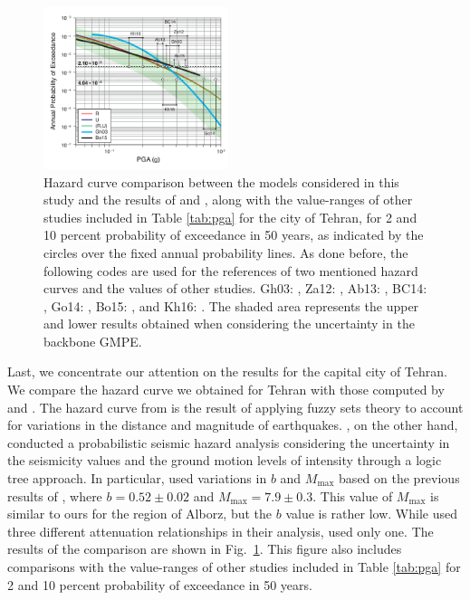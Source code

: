 \begin{figure}[t]
    \centering
    \includegraphics[width=0.48\textwidth]{figures/pdf/figure-14}
    \caption{Hazard curve comparison between the models considered in this study and the results of \citet{Ghodrati2003} and \citet{Boostan2015}, along with the value-ranges of other studies included in Table \ref{tab:pga} for the city of Tehran, for 2 and 10 percent probability of exceedance in 50 years, as indicated by the circles over the fixed annual probability lines. As done before, the following codes are used for the references of two mentioned hazard curves and the values of other studies.
        Gh03: \citet{Ghodrati2003},
        Za12: \citet{Zare2012},
        Ab13: \citet{Abdi2013},
        BC14: \citet{BHRC2014},
        Go14: \citet{Golara2014},
        Bo15: \citet{Boostan2015}, and
        Kh16: \citet{Khodaverdian_2016_BSSA}.
    The shaded area represents the upper and lower results obtained when considering the uncertainty in the backbone GMPE.}
    \label{fig:tehran}
\end{figure}

Last, we concentrate our attention on the results for the capital city of Tehran. We compare the hazard curve we obtained for Tehran with those computed by \citet{Ghodrati2003} and \citet{Boostan2015}. The hazard curve from \citet{Boostan2015} is the result of applying fuzzy sets theory to account for variations in the distance and magnitude of earthquakes. \citet{Ghodrati2003}, on the other hand, conducted a probabilistic seismic hazard analysis considering the uncertainty in the seismicity values and the ground motion levels of intensity through a logic tree approach. In particular, \citet{Ghodrati2003} used variations in $b$ and $M_{\max}$ based on the previous results of  \citet{Tavakoli1999}, where $b = 0.52 \pm0.02$ and $M_{\max} = 7.9 \pm 0.3$. This value of $M_{\max}$ is similar to ours for the region of Alborz, but the $b$ value is rather low. While \citet{Ghodrati2003} used three different attenuation relationships in their analysis, \citet{Boostan2015} used only one. The results of the comparison are shown in Fig.~\ref{fig:tehran}. This figure also includes comparisons with the value-ranges of other studies included in Table \ref{tab:pga} for 2 and 10 percent probability of exceedance in 50 years.

